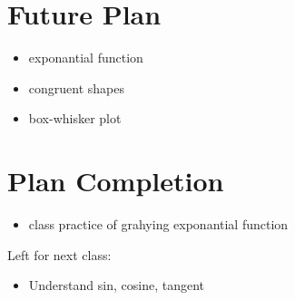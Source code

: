 \documentclass[12pt]{article}
\begin{document}
\section{Future Plan}
\begin{itemize}
    \item exponantial function
    \item congruent shapes
    \item box-whisker plot

\end{itemize}
\section{Plan Completion}
\begin{itemize}
    \item class practice of grahying exponantial function
\end{itemize}
Left for next class: 
\begin{itemize}
    \item Understand sin, cosine, tangent
\end{itemize}
\end{document}
